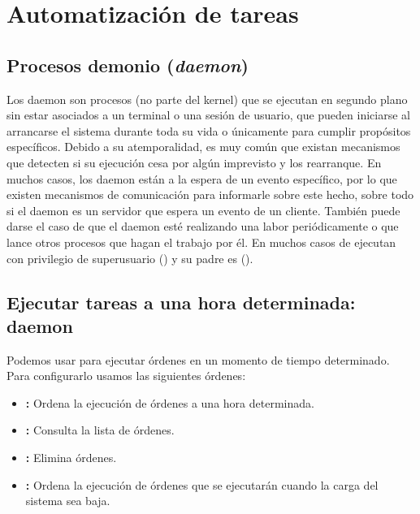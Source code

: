 \section{Automatización de tareas}

\subsection{Procesos demonio (\emph{daemon})}

Los daemon son procesos (no parte del kernel) que se ejecutan en segundo plano sin estar asociados a un terminal o una sesión de usuario, que pueden iniciarse al arrancarse el sistema durante toda su vida o únicamente para cumplir propósitos específicos.
Debido a su atemporalidad, es muy común que existan mecanismos que detecten si su ejecución cesa por algún imprevisto y los rearranque.
En muchos casos, los daemon están a la espera de un evento específico, por lo que existen mecanismos de comunicación para informarle sobre este hecho, sobre todo si el daemon es un servidor que espera un evento de un cliente.
También puede darse el caso de que el daemon esté realizando una labor periódicamente o que lance otros procesos que hagan el trabajo por él.
En muchos casos de ejecutan con privilegio de superusuario () y su padre es  ().

\subsection{Ejecutar tareas a una hora determinada: daemon }

Podemos usar  para ejecutar órdenes en un momento de tiempo determinado.
Para configurarlo usamos las siguientes órdenes:

\begin{itemize}
	\item{}\textbf{:} Ordena la ejecución de órdenes a una hora determinada.
	\item{}\textbf{:} Consulta la lista de órdenes.
	\item{}\textbf{:} Elimina órdenes.
	\item{}\textbf{:} Ordena la ejecución de órdenes que se ejecutarán cuando la carga del sistema sea baja.
\end{itemize}

\subsubsection{}

